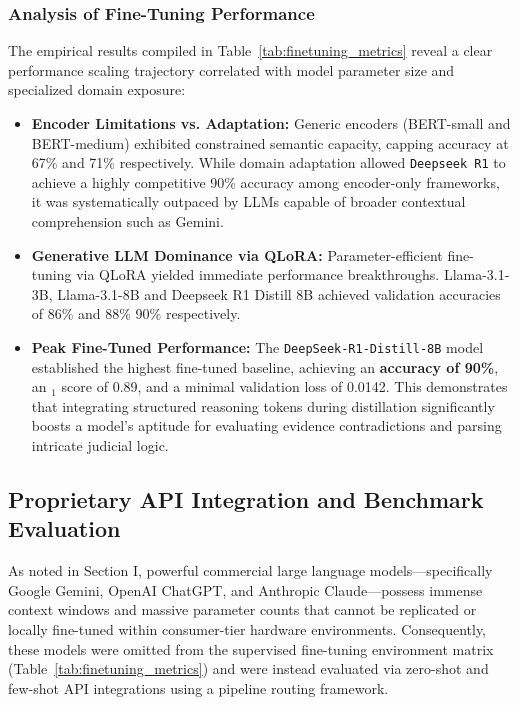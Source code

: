 \subsubsection{Analysis of Fine-Tuning Performance}
The empirical results compiled in Table~\ref{tab:finetuning_metrics} reveal a clear performance scaling trajectory correlated with model parameter size and specialized domain exposure:
\begin{itemize}
	\item \textbf{Encoder Limitations vs. Adaptation:} Generic encoders (BERT-small and BERT-medium) exhibited constrained semantic capacity, capping accuracy at 67\% and 71\% respectively. While domain adaptation allowed \texttt{Deepseek R1} to achieve a highly competitive 90\% accuracy among encoder-only frameworks, it was systematically outpaced by LLMs capable of broader contextual comprehension such as Gemini.
	\item \textbf{Generative LLM Dominance via QLoRA:} Parameter-efficient fine-tuning via QLoRA yielded immediate performance breakthroughs. Llama-3.1-3B, Llama-3.1-8B and Deepseek R1 Distill 8B achieved validation accuracies of 86\% and 88\% 90\% respectively. 
	\item \textbf{Peak Fine-Tuned Performance:} The \texttt{DeepSeek-R1-Distill-8B} model established the highest fine-tuned baseline, achieving an \textbf{accuracy of 90\%}, an $_1$ score of 0.89, and a minimal validation loss of 0.0142. This demonstrates that integrating structured reasoning tokens during distillation significantly boosts a model's aptitude for evaluating evidence contradictions and parsing intricate judicial logic.
\end{itemize}

\subsection{Proprietary API Integration and Benchmark Evaluation}
As noted in Section I, powerful commercial large language models—specifically Google Gemini, OpenAI ChatGPT, and Anthropic Claude—possess immense context windows and massive parameter counts that cannot be replicated or locally fine-tuned within consumer-tier hardware environments. Consequently, these models were omitted from the supervised fine-tuning environment matrix (Table~\ref{tab:finetuning_metrics}) and were instead evaluated via zero-shot and few-shot API integrations using a pipeline routing framework.

